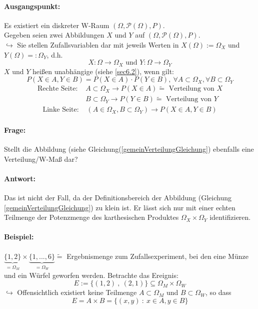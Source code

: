 \documentclass[12pt,a4paper]{article}
\begin{document}
	\paragraph{Ausgangspunkt:}
	Es existiert ein diskreter W-Raum $(\Omega,\mathcal{P}(\Omega),P)$.\\
	Gegeben seien zwei Abbildungen $X$ und $Y$ auf $(\Omega,\mathcal{P}(\Omega),P)$.\\
	$\hookrightarrow$ Sie stellen Zufallsvariablen dar mit jeweils Werten in $X(\Omega):=\Omega_X$ und $Y(\Omega)=:\Omega_Y$, d.h.
	$$X:\Omega\rightarrow\Omega_X \text{ und } Y:\Omega\rightarrow\Omega_Y$$
	$X$ und $Y$ heißen unabhängige (siehe \ref{sec6.2}), wenn gilt:
	$$P(X\in A, Y\in B)=P(X\in A) \cdot P(Y\in B), \:\forall A\subset\Omega_X, \forall B\subset\Omega_Y$$	
	\begin{align*}
	\text{Rechte Seite: } & A\subset\Omega_X\rightarrow P(X\in A) \tilde{=} \text{ Verteilung von } X\\
	& B\subset\Omega_Y\rightarrow P(Y\in B) \tilde{=}  \text{ Verteilung von } Y
	\end{align*}
	\begin{align}
	\label{gemeinVerteilungGleichung}
	\text{Linke Seite: } &  (A\in\Omega_X , B\subset\Omega_Y)\rightarrow P(X\in A, Y\in B)
	\end{align}
	
			
	
	\paragraph{Frage:}
	Stellt die Abbildung (siehe Gleichung(\ref{gemeinVerteilungGleichung}) ebenfalls eine Verteilung/W-Maß dar?
	\paragraph{Antwort:}
	Das ist nicht der Fall, da der Definitionsbereich der Abbildung (Gleichung \ref{gemeinVerteilungGleichung}) zu klein ist. Er lässt sich nur mit einer echten Teilmenge der Potenzmenge des karthesischen Produktes $\Omega_X \times\Omega_Y$ identifizieren.
	\paragraph{Beispiel:}
	$\underbrace{\{1,2\}}_{=\Omega_M} \times \underbrace{\{1,...,6\}}_{=\Omega_W} \tilde{=}$ Ergebnismenge zum Zufallsexperiment,
	bei den eine Münze und ein Würfel geworfen werden. Betrachte das Ereignis:
	$$E:=\{(1,2)\: , \: (2,1)\}\subseteq\Omega_M \times \Omega_W$$
	$\hookrightarrow$ Offensichtlich existiert keine Teilmenge $A\subset\Omega_M$ und $B\subset\Omega_W$, so dass
	$$E=A\times B=\{(x,y)\: : \: x\in A, y\in B\}$$
\end{document}
